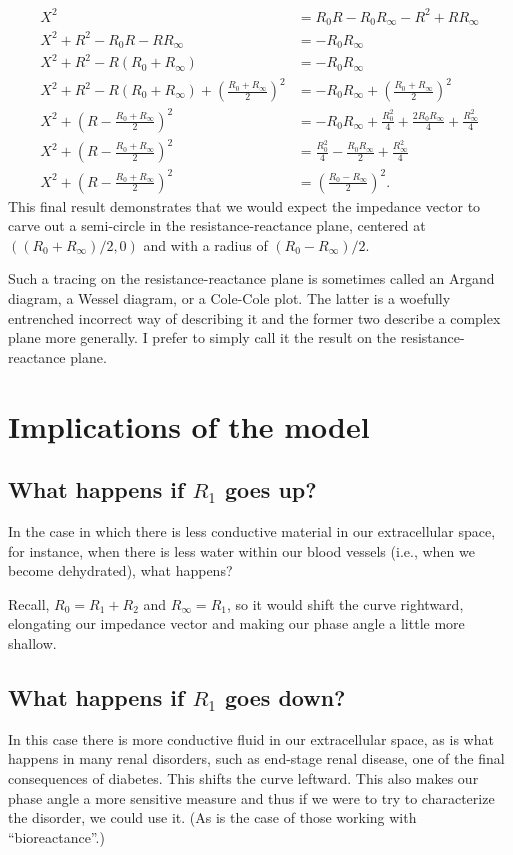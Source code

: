 \documentclass[11pt]{book}
\begin{document}
\begin{align}
	X^2 &= R_0R - R_0R_{\infty} - R^2 + R R_{\infty} \\
	X^2 + R^2- R_0R - R R_{\infty} &=  - R_0R_{\infty} \\
	X^2 + R^2- R(R_0 + R_{\infty}) &=  - R_0R_{\infty} \\ 
	X^2 + R^2- R(R_0 + R_{\infty}) + \left(\frac{R_0 + R_{\infty}}{2}\right)^2 &=  - R_0R_{\infty} + \left(\frac{R_0 + R_{\infty}}{2}\right)^2 \\
	X^2 + \left(R - \frac{R_0 + R_{\infty}}{2}\right)^2 &=  - R_0R_{\infty} + \frac{R_0^2}{4} + \frac{2R_0R_{\infty}}{4} + \frac{R_{\infty}^2}{4} \\
	X^2 + \left(R - \frac{R_0 + R_{\infty}}{2}\right)^2 &= \frac{R_0^2}{4} - \frac{R_0R_{\infty}}{2} + \frac{R_{\infty}^2}{4} \\
	X^2 + \left(R - \frac{R_0 + R_{\infty}}{2}\right)^2 &= \left(\frac{R_0 - R_{\infty}}{2}\right)^2.
\end{align}
This final result demonstrates that we would expect the impedance vector to carve out a semi-circle in the resistance-reactance plane, centered at $((R_0 + R_{\infty})/2, 0)$ and with a radius of $(R_0 - R_{\infty})/2$.

Such a tracing on the resistance-reactance plane is sometimes called an Argand diagram, a Wessel diagram, or a Cole-Cole plot. The latter is a woefully entrenched incorrect way of describing it and the former two describe a complex plane more generally. I prefer to simply call it the result on the resistance-reactance plane.

\section{Implications of the model}
\subsection{What happens if $R_1$ goes up?}
In the case in which there is less conductive material in our extracellular space, for instance, when there is less water within our blood vessels (i.e., when we become dehydrated), what happens?

Recall, $R_0 = R_1 + R_2$ and $R_{\infty} = R_1$, so it would shift the curve rightward, elongating our impedance vector and making our phase angle a little more shallow.

\subsection{What happens if $R_1$ goes down?}
In this case there is more conductive fluid in our extracellular space, as is what happens in many renal disorders, such as end-stage renal disease, one of the final consequences of diabetes. This shifts the curve leftward. This also makes our phase angle a more sensitive measure and thus if we were to try to characterize the disorder, we could use it. (As is the case of those working with ``bioreactance''.)
\end{document}
